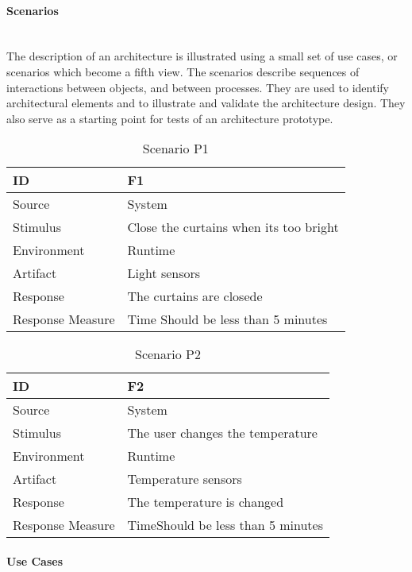 \documentclass[../document]{subfiles}
\begin{document}
\paragraph{Scenarios} \ \\
The description of an architecture is illustrated using a small set of use cases, or scenarios which become a fifth view. The scenarios describe sequences of interactions between objects, and between processes. They are used to identify architectural elements and to illustrate and validate the architecture design. They also serve as a starting point for tests of an architecture prototype.

\begin{table}[H]
	\caption{Scenario P1}
	\begin{tabularx}{\textwidth}{|X|X|}
		\hline
		ID					& F1 \\ \hline
		Source				& System \\ \hline
		Stimulus			& Close the curtains when its too bright \\ \hline
		Environment			& Runtime \\ \hline
		Artifact			& Light sensors \\ \hline
		Response			& The curtains are closede \\ \hline
		Response Measure	& Time \newline Should be less than 5 minutes
		\\ \hline
	\end{tabularx}
\end{table}

\begin{table}[H]
	\caption{Scenario P2}
	\begin{tabularx}{\textwidth}{|X|X|}
		\hline
		ID					& F2 \\ \hline
		Source				& System \\ \hline
		Stimulus			& The user changes the temperature \\ \hline
		Environment			& Runtime \\ \hline
		Artifact			& Temperature sensors \\ \hline
		Response			& The temperature is changed \\ \hline
		Response Measure	& Time\newline Should be less than 5 minutes
		\\ \hline
	\end{tabularx}
\end{table}


\paragraph{Use Cases} \ \\
\end{document}

